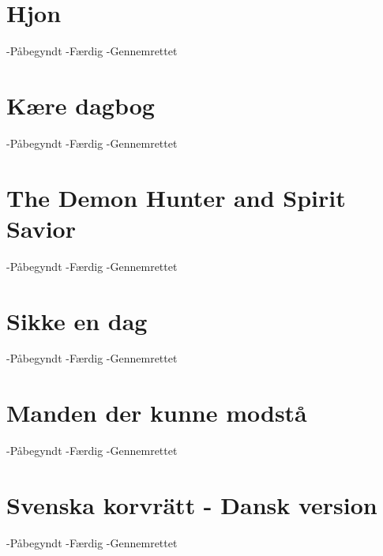 \documentclass[]{article}
\begin{document}
	\section{Hjon}
	-Påbegyndt \checkmark
	-Færdig
	-Gennemrettet
	
	\section{Kære dagbog}
	-Påbegyndt
	-Færdig
	-Gennemrettet
	
	\section{The Demon Hunter and Spirit Savior}
	-Påbegyndt \checkmark
	-Færdig
	-Gennemrettet
	
	\section{Sikke en dag}
	-Påbegyndt \checkmark
	-Færdig
	-Gennemrettet
	
	\section{Manden der kunne modstå}
	-Påbegyndt \checkmark
	-Færdig
	-Gennemrettet
	
	\section{Svenska korvrätt - Dansk version} 
	-Påbegyndt \checkmark
	-Færdig \checkmark
	-Gennemrettet
\end{document}
